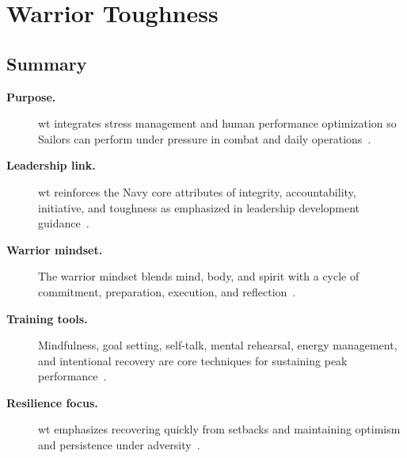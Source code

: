 \documentclass[../main.tex]{subfiles}
\begin{document}
\section{Warrior Toughness}

\subsection{Summary}
\begin{description}
  \item[\textbf{Purpose.}] \ac{wt} integrates stress management and human performance optimization so
  Sailors can perform under pressure in combat and daily operations~\autocite{edo-5-2-8-warrior-toughness-2025,NETC-Warrior-Toughness-2026}.
  \item[\textbf{Leadership link.}] \ac{wt} reinforces the Navy core attributes of integrity, accountability,
  initiative, and toughness as emphasized in leadership development guidance~\autocite{edo-5-2-8-warrior-toughness-2025,NETC-Warrior-Toughness-Components-2026}.
  \item[\textbf{Warrior mindset.}] The warrior mindset blends mind, body, and spirit with a cycle of
  commitment, preparation, execution, and reflection~\autocite{edo-5-2-8-warrior-toughness-2025,NETC-Warrior-Toughness-Components-2026}.
  \item[\textbf{Training tools.}] Mindfulness, goal setting, self-talk, mental rehearsal, energy management, and
  intentional recovery are core techniques for sustaining peak performance~\autocite{edo-5-2-8-warrior-toughness-2025,NETC-Warrior-Toughness-Components-2026}.
  \item[\textbf{Resilience focus.}] \ac{wt} emphasizes recovering quickly from setbacks and maintaining
  optimism and persistence under adversity~\autocite{edo-5-2-8-warrior-toughness-2025}.
\end{description}
\end{document}
